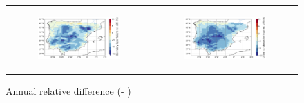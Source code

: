 \begin{figure}[htbp]
\begin{tabular}{cc}
        \begin{subfigure}[b]{0.5\textwidth}
            \caption{}
            \includegraphics[width=\textwidth]{images/chap4/future/reldiffmap_s_pblh_futirr.png}
        \end{subfigure} &
        \begin{subfigure}[b]{0.5\textwidth}
            \caption{}
            \includegraphics[width=\textwidth]{images/chap4/future/reldiffmap_s_lcl_futirr.png}
        \end{subfigure} \\
    \end{tabular}
    \caption{Annual relative difference (\futnoirr - \futirr)}
    \label{fig:reldiffmaps_future_irr}
\end{figure}


